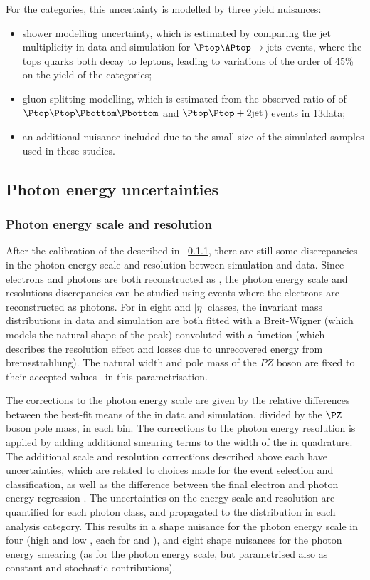 For the \TTHTag categories, this uncertainty is modelled by three yield nuisances:
\begin{itemize}
\item shower modelling uncertainty, which is estimated by comparing the jet multiplicity in data and simulation for $\Ptop \APtop \rightarrow \text{jets}$ events, where the tops quarks both decay to leptons, leading to variations of the order of 45\% on the yield of the \TTHTag categories; 
\item gluon splitting modelling, which is estimated from the observed ratio of \crosssection\s of  $\Ptop \Ptop \Pbottom \Pbottom$ and $\Ptop \Ptop +2\text{jet}$) events in 13\TeV data;
\item an additional nuisance included due to the small size of the simulated samples used in these studies.
\end{itemize}

\subsection{Photon energy uncertainties}

\subsubsection{Photon energy scale and resolution}

After the calibration of the \ECAL described in \Sec~\ref{}, there are still some discrepancies in the photon energy scale and resolution between simulation and data. Since electrons and photons are both reconstructed as \SC\s, the photon energy scale and resolutions discrepancies can be studied using \Zee events where the electrons are reconstructed as photons.
For \SC\s in eight \RNINE and $|\eta|$ classes, the invariant mass distributions in data and simulation are both fitted with a Breit-Wigner (which models the natural shape of the \PZ peak) convoluted with a \CB function (which describes the \ECAL resolution effect and losses due to unrecovered energy from bremsstrahlung). The natural width and pole mass of the $PZ$ boson are fixed to their accepted values~\cite{PDF} in this parametrisation. 

The corrections to the photon energy scale are given by the relative differences between the best-fit means of the \CB in data and simulation, divided by the $\PZ$ boson pole mass, in each bin. The corrections to the photon energy resolution is applied by adding additional smearing terms to the width of the \CB in quadrature. The additional scale and resolution corrections described above each have uncertainties, which are related to choices made for the \Zee event selection and classification, as well as the difference between the final electron and photon energy regression \BDT\s. The uncertainties on the energy scale and resolution are quantified for each photon class, and propagated to the \mgg distribution in each analysis category. This results in a shape nuisance for the photon energy scale in four (high and low \RNINE, each for \EB and \EE), and eight shape nuisances for the photon energy smearing (as for the photon energy scale, but parametrised also as constant and stochastic contributions). 

